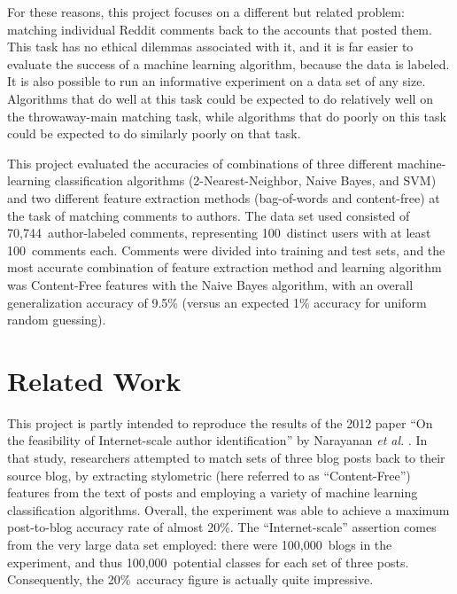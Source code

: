 \documentclass{article}
\begin{document}
For these reasons, this project focuses on a different but related problem: matching individual Reddit comments back to the accounts that posted them. This task has no ethical dilemmas associated with it, and it is far easier to evaluate the success of a machine learning algorithm, because the data is labeled. It is also possible to run an informative experiment on a data set of any size. Algorithms that do well at this task could be expected to do relatively well on the throwaway-main matching task, while algorithms that do poorly on this task could be expected to do similarly poorly on that task.

This project evaluated the accuracies of combinations of three different machine-learning classification algorithms (2-Nearest-Neighbor, Naive Bayes, and SVM) and two different feature extraction methods (bag-of-words and content-free) at the task of matching comments to authors. The data set used consisted of 70,744~author-labeled comments, representing 100~distinct users with at least 100~comments each. Comments were divided into training and test sets, and the most accurate combination of feature extraction method and learning algorithm was Content-Free features with the Naive Bayes algorithm, with an overall generalization accuracy of 9.5\% (versus an expected 1\% accuracy for uniform random guessing). 

\section{Related Work}

This project is partly intended to reproduce the results of the 2012 paper ``On the feasibility of Internet-scale author identification'' by Narayanan \textit{et al.} \cite{narayanan2012feasibility}. In that study, researchers attempted to match sets of three blog posts back to their source blog, by extracting stylometric (here referred to as ``Content-Free'') features from the text of posts and employing a variety of machine learning classification algorithms. Overall, the experiment was able to achieve a maximum post-to-blog accuracy rate of almost 20\%. The ``Internet-scale'' assertion comes from the very large data set employed: there were 100,000~blogs in the experiment, and thus 100,000~potential classes for each set of three posts. Consequently, the 20\%~accuracy figure is actually quite impressive.
\end{document}
